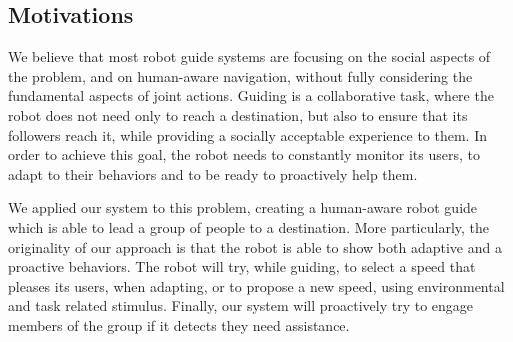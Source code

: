 \subsection{Motivations}
We believe that most robot guide systems are focusing on the social aspects of the problem, and on human-aware navigation, without fully considering the fundamental aspects of joint actions. Guiding is a collaborative task, where the robot does not need only to reach a destination, but also to ensure that its followers reach it, while providing a socially acceptable experience to them. In order to achieve this goal, the robot needs to constantly monitor its users, to adapt to their behaviors and to be ready to proactively help them.

We applied our system to this problem, creating a human-aware robot guide which is able to lead a group of people to a destination. More particularly, the originality of our approach is that the robot is able to show both adaptive and a proactive behaviors. The robot will try, while guiding, to select a speed that pleases its users, when adapting, or to propose a new speed, using environmental and task related stimulus. Finally, our system will proactively try to engage members of the group if it detects they need assistance. 

